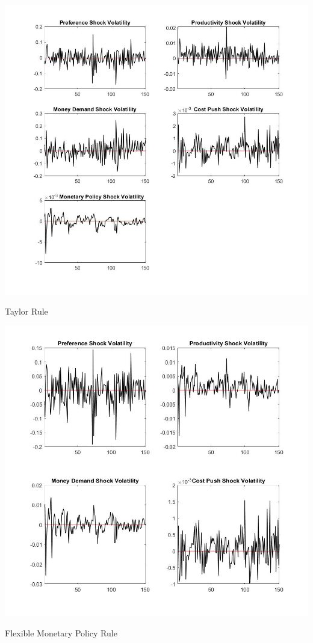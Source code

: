 \documentclass[11pt,preprint, authoryear]{elsarticle}
\let\origfigure\figure
\let\endorigfigure\endfigure
\renewenvironment{figure}[1][2] {
    \expandafter\origfigure\expandafter[H]
} {
    \endorigfigure
}
\numberwithin{equation}{section}
\numberwithin{figure}{section}
\numberwithin{table}{section}
\begin{document}
\begin{figure}
    \centering 
    \begin{minipage}[t]{8.2cm} 
        \centering 
        \includegraphics[width=\linewidth]{tay_smooth.jpg} 
        \caption{Taylor Rule}
    \end{minipage} 
    \hspace{0.1cm} 
    \begin{minipage}[t]{8.2cm} 
        \centering 
        \includegraphics[width=\linewidth]{flex_smooth.jpg} 
        \caption{Flexible Monetary Policy Rule}
    \end{minipage}
    \caption{Smoothed shocks}
    \label{smooth}
\end{figure}
\end{document}
